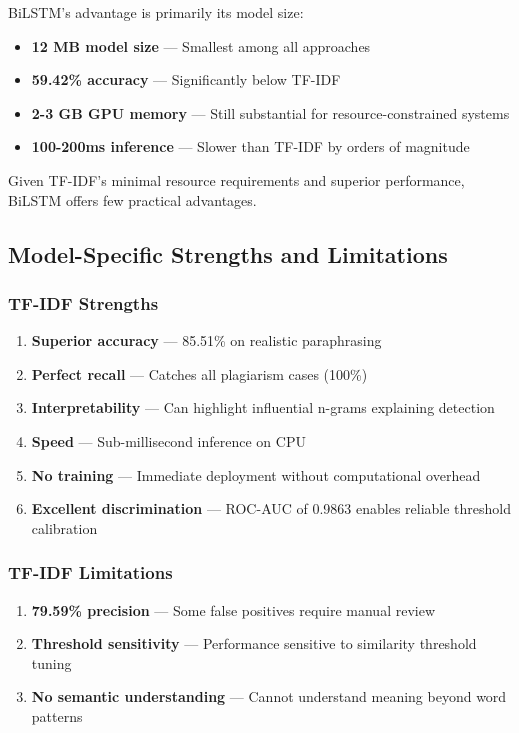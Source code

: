 BiLSTM's advantage is primarily its model size:
\begin{itemize}
  \item \textbf{12 MB model size} --- Smallest among all approaches
  \item \textbf{59.42\% accuracy} --- Significantly below TF-IDF
  \item \textbf{2-3 GB GPU memory} --- Still substantial for resource-constrained systems
  \item \textbf{100-200ms inference} --- Slower than TF-IDF by orders of magnitude
\end{itemize}

Given TF-IDF's minimal resource requirements and superior performance, BiLSTM offers few practical advantages.

\subsection{Model-Specific Strengths and Limitations}

\subsubsection{TF-IDF Strengths}

\begin{enumerate}
  \item \textbf{Superior accuracy} --- 85.51\% on realistic paraphrasing
  \item \textbf{Perfect recall} --- Catches all plagiarism cases (100\%)
  \item \textbf{Interpretability} --- Can highlight influential n-grams explaining detection
  \item \textbf{Speed} --- Sub-millisecond inference on CPU
  \item \textbf{No training} --- Immediate deployment without computational overhead
  \item \textbf{Excellent discrimination} --- ROC-AUC of 0.9863 enables reliable threshold calibration
\end{enumerate}

\subsubsection{TF-IDF Limitations}

\begin{enumerate}
  \item \textbf{79.59\% precision} --- Some false positives require manual review
  \item \textbf{Threshold sensitivity} --- Performance sensitive to similarity threshold tuning
  \item \textbf{No semantic understanding} --- Cannot understand meaning beyond word patterns
\end{enumerate}

